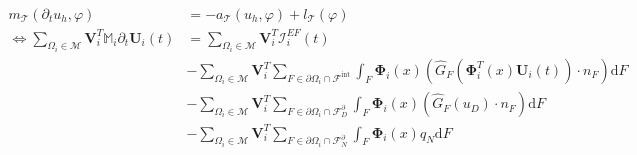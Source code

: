 \documentclass[11pt, a4paper, oneside]{report}
\begin{document}
\begin{appendices}
\begin{equation}
    \begin{aligned}
        m_\mathcal{T}(\partial_t u_h, \varphi) &= -a_\mathcal{T}(u_h, \varphi) + l_\mathcal{T}(\varphi) \\
        \Leftrightarrow \sum_{\Omega_i \in \mathcal{M}} \bm{V}_i^T \mathbb{M}_i \partial_t \bm{U}_i(t) &= \sum_{\Omega_i \in \mathcal{M}} \bm{V}_i^T \bm{\mathcal{I}}_i^{EF}(t) \\
        & - \sum_{\Omega_i \in \mathcal{M}} \bm{V}_i^T \sum_{F \in \partial \Omega_i \cap \mathcal{F}^\text{int}} \int_F \bm{\Phi}_i(x) \left( \widehat{G}_F \left( \bm{\Phi}_i^T(x) \bm{U}_i(t) \right) \cdot n_F \right) \text{d}F \\
        & - \sum_{\Omega_i \in \mathcal{M}} \bm{V}_i^T \sum_{F \in \partial \Omega_i \cap \mathcal{F}_D^\partial} \int_F \bm{\Phi}_i(x) \left( \widehat{G}_F(u_D) \cdot n_F \right) \text{d}F \\
        & - \sum_{\Omega_i \in \mathcal{M}} \bm{V}_i^T \sum_{F \in \partial \Omega_i \cap \mathcal{F}_N^\partial} \int_F \bm{\Phi}_i(x) q_N \text{d}F
    \end{aligned}
\end{equation}


\end{appendices}
\end{document}
